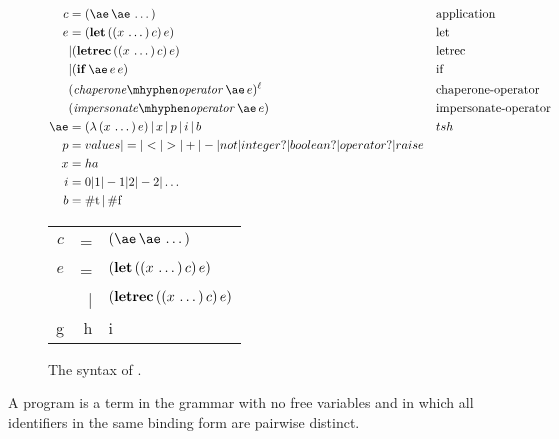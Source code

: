 \documentclass{sigplanconf}
\begin{document}
\newcommand{\true}[0]{\mathrm{\#t}}
\newcommand{\false}[0]{\mathrm{\#f}}
\setlength{\tabcolsep}{1pt}
\begin{figure}
\label{fig:syntax}
\begin{align*}
c &= \appe{\ae}{\ae\,\dots} && \text{application}\\
e &= \lete{x\,\dots}{c}{e} && \text{let}\\
  &|  \letrece{x\,\dots}{c}{e} && \text{letrec}\\
  &|  \ife{\ae}{e}{e} && \text{if}\\
  &   \chae{\ae}{e} && \text{chaperone-operator}\\
  &   \impe{\ae}{e} && \text{impersonate-operator}\\
\ae &= \lame{x\,\dots}{e}\,|\,x\,|\,p\,|\,i\,|\,b && tsh\\
p &= values | = | < | > | + | - | not | integer? | boolean? | operator? | raise && \\
x &= ha & \\
i &= 0|1|-1|2|-2|\dots\\
b &= \true\,|\,\false\\
\end{align*}

\begin{tabular}{rrl}
$c$ & = & $\appe{\ae}{\ae\,\dots}$\\
$e$ & = & $(\mathbf{let}\,((x\,\dots)\,c)\,e)$\\
    & | & $(\mathbf{letrec}\,((x\,\dots)\,c)\,e)$\\
g & h & i
\end{tabular}
\caption{The syntax of \chapcalc.}
\end{figure}

A program is a term in the grammar with no free variables and in which all identifiers in the same binding form are pairwise distinct.






\end{document}
